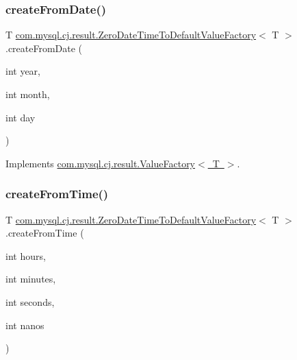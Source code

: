 \subsubsection{\texorpdfstring{create\+From\+Date()}{createFromDate()}}
{\footnotesize\ttfamily T \mbox{\hyperlink{classcom_1_1mysql_1_1cj_1_1result_1_1_zero_date_time_to_default_value_factory}{com.\+mysql.\+cj.\+result.\+Zero\+Date\+Time\+To\+Default\+Value\+Factory}}$<$ T $>$.create\+From\+Date (\begin{DoxyParamCaption}\item[{int}]{year,  }\item[{int}]{month,  }\item[{int}]{day }\end{DoxyParamCaption})}



Implements \mbox{\hyperlink{interfacecom_1_1mysql_1_1cj_1_1result_1_1_value_factory_a5c7828e8fe372c9070e0e64ddafac761}{com.\+mysql.\+cj.\+result.\+Value\+Factory$<$ T $>$}}.

\mbox{\label{classcom_1_1mysql_1_1cj_1_1result_1_1_zero_date_time_to_default_value_factory_a97adb0b51c3cf9d2bd908ea650f25f2d}} 
\subsubsection{\texorpdfstring{create\+From\+Time()}{createFromTime()}}
{\footnotesize\ttfamily T \mbox{\hyperlink{classcom_1_1mysql_1_1cj_1_1result_1_1_zero_date_time_to_default_value_factory}{com.\+mysql.\+cj.\+result.\+Zero\+Date\+Time\+To\+Default\+Value\+Factory}}$<$ T $>$.create\+From\+Time (\begin{DoxyParamCaption}\item[{int}]{hours,  }\item[{int}]{minutes,  }\item[{int}]{seconds,  }\item[{int}]{nanos }\end{DoxyParamCaption})}



